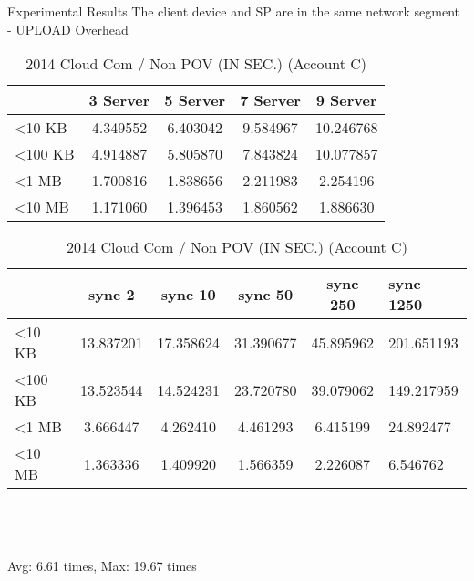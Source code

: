 \begin{frame}{Experimental Results}
{The client device and SP are in the same network segment - UPLOAD Overhead}
	\scriptsize
    \begin{table}[]
    \centering
    \caption{My Method / Non POV (IN SEC.) (Account C)}
    \begin{tabular}{lcccc}
                         & 3 Server & 5 Server & 7 Server & 9 Server  \\ \hline
        \textless 10 KB  & 4.349552 & 6.403042 & 9.584967 & 10.246768 \\ \hline
        \textless 100 KB & 4.914887 & 5.805870 & 7.843824 & 10.077857 \\ \hline
        \textless 1 MB   & 1.700816 & 1.838656 & 2.211983 & 2.254196  \\ \hline
        \textless 10 MB  & 1.171060 & 1.396453 & 1.860562 & 1.886630  \\ \hline
    \end{tabular}
    \caption{2014 Cloud Com / Non POV (IN SEC.) (Account C)}
    \begin{tabular}{lccccl}
                         & sync 2    & sync 10   & sync 50   & sync 250  & sync 1250  \\ \hline
        \textless 10 KB  & 13.837201 & 17.358624 & 31.390677 & 45.895962 & 201.651193 \\ \hline
        \textless 100 KB & 13.523544 & 14.524231 & 23.720780 & 39.079062 & 149.217959 \\ \hline
        \textless 1 MB   & 3.666447  & 4.262410  & 4.461293  & 6.415199  & 24.892477  \\ \hline
        \textless 10 MB  & 1.363336  & 1.409920  & 1.566359  & 2.226087  & 6.546762   \\ \hline
    \end{tabular}
    ~\\
    ~\\
    ~\\
    \alert{Avg: 6.61 times, Max: 19.67 times}
    \end{table}
\end{frame}

